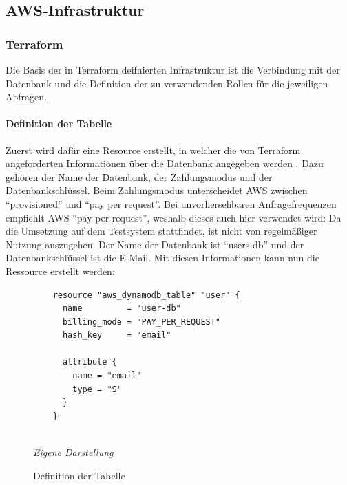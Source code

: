\subsection{AWS-Infrastruktur}
\subsubsection{Terraform}
Die Basis der in Terraform deifnierten Infrastruktur ist die Verbindung mit der Datenbank und die Definition der zu verwendenden Rollen für die jeweiligen Abfragen. 
\paragraph{Definition der Tabelle}
Zuerst wird dafür eine Resource erstellt, in welcher die von Terraform angeforderten Informationen über die Datenbank angegeben werden \newline \cite{TerraformBestPractices2024}. Dazu gehören der Name der Datenbank, der Zahlungsmodus und der Datenbankschlüssel. Beim Zahlungsmodus unterscheidet AWS zwischen ``provisioned'' und ``pay per request''. Bei unvorhersehbaren Anfragefrequenzen empfiehlt AWS ``pay per request'', weshalb dieses auch hier verwendet wird: Da die Umsetzung auf  dem Testsystem stattfindet, ist nicht von regelmäßiger Nutzung auszugehen. Der Name der Datenbank ist ``users-db'' und der Datenbankschlüssel ist die E-Mail. Mit diesen Informationen kann nun die Ressource erstellt werden:

	\begin{figure}[H]
	\centering
	\begin{minipage}[t]{.7\textwidth} %
	\caption{Definition der Tabelle} %
	\begin{verbatim}
	resource "aws_dynamodb_table" "user" {
	  name         = "user-db"
	  billing_mode = "PAY_PER_REQUEST"
	  hash_key     = "email"
	
	  attribute {
	    name = "email"
	    type = "S"
	  }
	}
	
	\end{verbatim}
	
	\textit{Eigene Darstellung} %
	\label{fig:tabellenDefinition}
	\end{minipage}
	\end{figure}
